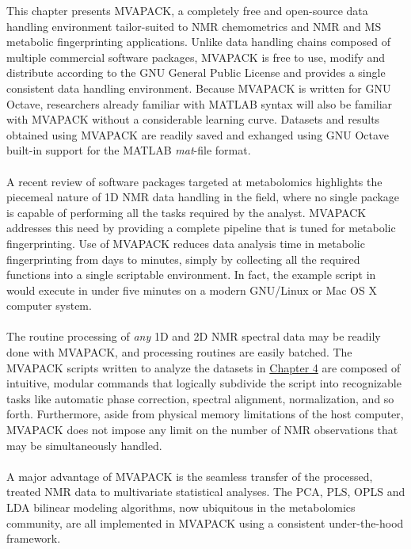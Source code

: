 \begin{doublespace}
This chapter presents MVAPACK, a completely free and open-source data handling
environment tailor-suited to NMR chemometrics and \hnmr{} NMR and MS metabolic
fingerprinting applications. Unlike data handling chains composed of multiple
commercial software packages, MVAPACK is free to use, modify and distribute
according to the GNU General Public License \cite{gpl3} and provides a single
consistent data handling environment. Because MVAPACK is written for GNU
Octave, researchers already familiar with MATLAB syntax will also be familiar
with MVAPACK without a considerable learning curve. Datasets and results
obtained using MVAPACK are readily saved and exhanged using GNU Octave built-in
support for the MATLAB {\it mat}-file format.
\\\\
A recent review \cite{izquierdo:pnmrs2011} of software packages targeted at
metabolomics highlights the piecemeal nature of 1D \hnmr{} NMR data handling
in the field, where no single package is capable of performing all the tasks
required by the analyst. MVAPACK addresses this need by providing a complete
pipeline that is tuned for metabolic fingerprinting. Use of MVAPACK reduces
data analysis time in metabolic fingerprinting from days to minutes, simply
by collecting all the required functions into a single scriptable environment.
In fact, the example script in  would execute in under
five minutes on a modern GNU/Linux or Mac OS X computer system.
\\\\
The routine processing of {\it any} 1D and 2D NMR spectral data may be readily
done with MVAPACK, and processing routines are easily batched. The MVAPACK
scripts written to analyze the datasets in \hyperlink{chapter.4}{Chapter 4}
are composed of intuitive, modular commands that logically subdivide the script
into recognizable tasks like automatic phase correction, spectral alignment,
normalization, and so forth. Furthermore, aside from physical memory
limitations of the host computer, MVAPACK does not impose any limit
on the number of NMR observations that may be simultaneously handled.
\\\\
A major advantage of MVAPACK is the seamless transfer of the processed, treated
NMR data to multivariate statistical analyses. The PCA, PLS, OPLS and LDA
bilinear modeling algorithms, now ubiquitous in the metabolomics community,
are all implemented in MVAPACK using a consistent under-the-hood framework.

\end{doublespace}
